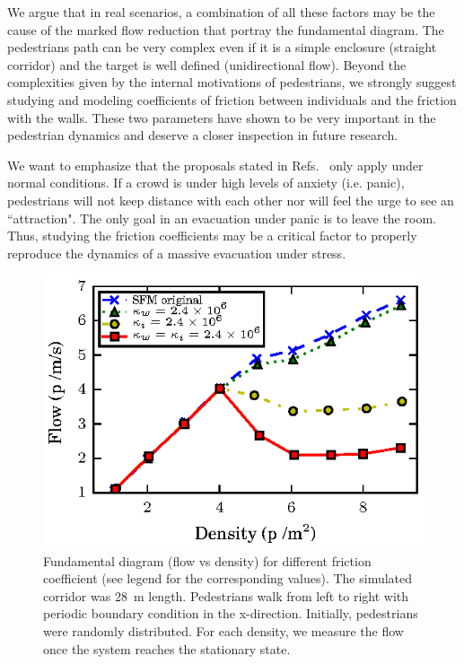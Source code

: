 We argue that in real scenarios, a combination of all these factors may be the cause of the marked flow reduction that portray the fundamental diagram. The pedestrians path can be very complex even if it is a simple enclosure (straight corridor) and the target is well defined (unidirectional flow). Beyond the complexities given by the internal motivations of pedestrians, we strongly suggest studying and modeling coefficients of friction between individuals and the friction with the walls. These two parameters have shown to be very important in the pedestrian dynamics and deserve a closer inspection in future research.

We want to emphasize that the proposals stated in Refs.~\cite{parisi2,johansson,kwak}  only apply under normal conditions. If a crowd is under high levels of anxiety (i.e. panic), pedestrians will not keep distance with each other nor will feel the urge to see an ``attraction". The only goal in an evacuation under panic is to leave the room. Thus, studying the friction coefficients may be a critical factor to properly reproduce the dynamics of a massive evacuation under stress.


\begin{figure}[htbp!]
\includegraphics[width=\columnwidth]
{plots/flow-density_pasillo22m_fgmodified_multi.eps}
\caption{\label{fgmodified-w22} Fundamental diagram (flow vs density) for different friction coefficient (see legend for the corresponding values). The simulated corridor was 28~m length. Pedestrians walk from left to right with periodic boundary condition in the x-direction. Initially, pedestrians were randomly distributed. For each density, we measure the flow once the system reaches the stationary state.}
\end{figure}


